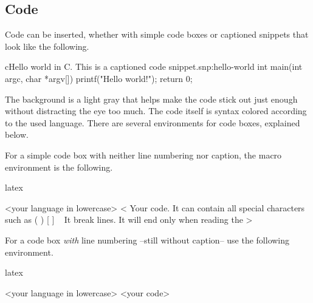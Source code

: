 \documentclass[raggedright, twoside, 11pt, colorful]{tufte-style-article}
\begin{document}
\newpage

\subsection{Code}
\label{sub:code}

Code can be inserted, whether with simple code boxes or captioned snippets that look like the following.
\begin{snippet}{c}{Hello world in C. This is a captioned code snippet.}{snp:hello-world}
int main(int argc, char *argv[]) {
	printf("Hello world!");
	return 0;
}
\end{snippet}

The background is a light gray that helps make the code stick out just enough without distracting the eye too much. The code itself is syntax colored according to the used language. There are several environments for code boxes, explained below.

For a simple code box with neither line numbering nor caption, the macro environment is the following.

%
\begin{altcodebox}{latex}
\begin{codebox}{<your language in lowercase>}
<
Your code. It can contain all special characters such as { } ( ) [ ] \ %
It break lines.
It will end only when reading the %
>
\end{codebox}
\end{altcodebox}

For a code box \textit{with} line numbering --still without caption-- use the following environment.
\begin{altcodebox}{latex}
\begin{codeboxnum}{<your language in lowercase>}
<your code>
\end{codeboxnum}
\end{altcodebox}
\end{document}
